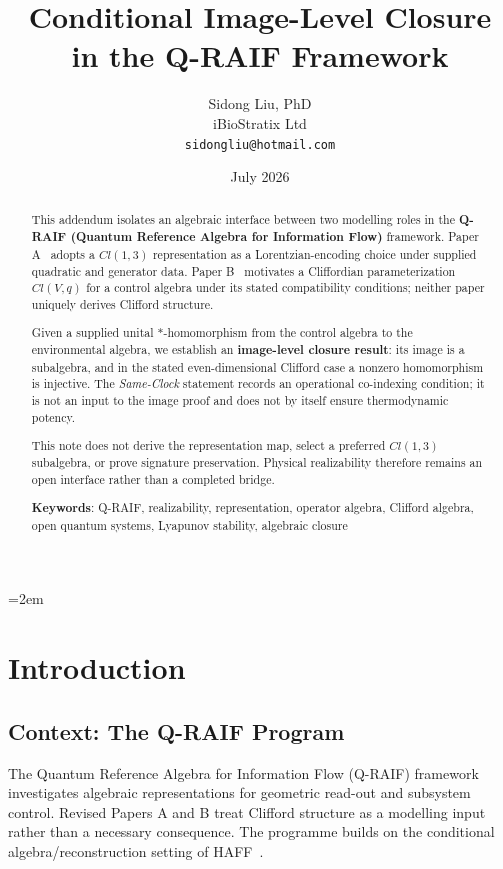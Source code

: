 \documentclass[12pt]{article}
\title{Conditional Image-Level Closure\\
in the Q-RAIF Framework}
\author{Sidong Liu, PhD \\
\small iBioStratix Ltd \\
\small \texttt{sidongliu@hotmail.com}}
\date{July 2026}
\begin{document}
\emergencystretch=2em
\raggedbottom
{}
\maketitle

\begin{abstract}
This addendum isolates an algebraic interface between two modelling roles in the \textbf{Q-RAIF (Quantum Reference Algebra for Information Flow)} framework.
Paper A~\cite{Liu2026QRAIF_A} adopts a $Cl(1,3)$ representation as a Lorentzian-encoding choice under supplied quadratic and generator data.
Paper B~\cite{Liu2026QRAIF_B} motivates a Cliffordian parameterization $Cl(V,q)$ for a control algebra under its stated compatibility conditions; neither paper uniquely derives Clifford structure.

Given a supplied unital $*$-homomorphism from the control algebra to the environmental algebra, we establish an \textbf{image-level closure result}: its image is a subalgebra, and in the stated even-dimensional Clifford case a nonzero homomorphism is injective.
The \emph{Same-Clock} statement records an operational co-indexing condition; it is not an input to the image proof and does not by itself ensure thermodynamic potency.

This note does not derive the representation map, select a preferred $Cl(1,3)$ subalgebra, or prove signature preservation.  Physical realizability therefore remains an open interface rather than a completed bridge.

\medskip
\noindent\textbf{Keywords}: Q-RAIF, realizability, representation, operator algebra, Clifford algebra, open quantum systems, Lyapunov stability, algebraic closure
\end{abstract}

\section{Introduction}
\label{sec:intro}

\subsection{Context: The Q-RAIF Program}

The Quantum Reference Algebra for Information Flow (Q-RAIF) framework investigates algebraic representations for geometric read-out and subsystem control.  Revised Papers A and B treat Clifford structure as a modelling input rather than a necessary consequence.  The programme builds on the conditional algebra/reconstruction setting of HAFF~\cite{Liu2026PaperA,Liu2026PaperB}.
\end{document}

